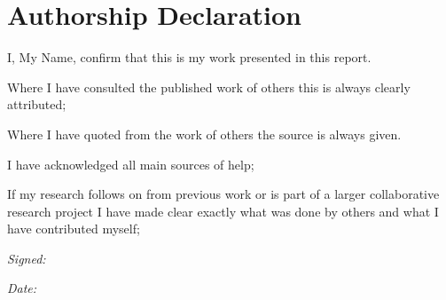 \section*{Authorship Declaration}
\vspace{0.5cm}

\begin{flushleft}
I, My Name, confirm that this is my work presented in this report.\newline

Where I have consulted the published work of others this is always clearly attributed;\newline

Where I have quoted from the work of others the source is always given.\newline

I have acknowledged all main sources of help; \newline

If my research follows on from previous work or is part of a larger collaborative research project I have made clear exactly what was done by others and what I have contributed myself;\newline

\end{flushleft}

\begin{flushleft} \large
\emph{Signed:} \\
\end{flushleft}

\vspace{.5cm}

\begin{flushleft} \large
\emph{Date:} \\
\end{flushleft}